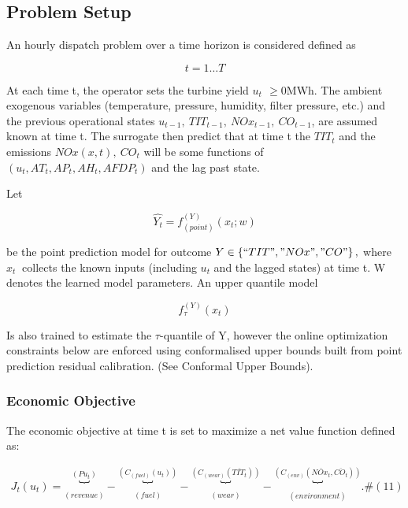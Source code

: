 \documentclass[11pt]{article}
\begin{document}
\section{}\label{section-7}

\subsection{\texorpdfstring{Problem Setup
}{Problem Setup }}\label{problem-setup}

An hourly dispatch problem over a time horizon is considered defined as

\[t = 1\ldots T\]

At each time t, the operator sets the turbine yield
\(u_{t\ }\  \geq 0\)MWh. The ambient exogenous variables (temperature,
pressure, humidity, filter pressure, etc.) and the previous operational
states \(u_{t - 1},\ TIT_{t - 1},\ NOx_{t - 1},\ CO_{t - 1}\), are
assumed known at time t. The surrogate then predict that at time t the
\(TIT_{t}\) and the emissions \(NOx(x,t),\ CO_{t}\) will be some
functions of \(\left( u_{t},AT_{t},AP_{t},AH_{t},AFDP_{t} \right)\) and
the lag past state.

Let

\[\widehat{Y_{t}} = f_{(point)}^{(Y)}\left( x_{t};w \right)\]

be the point prediction model for outcome
\(Y \in \left\{ ``TIT","NOx","CO" \right\},\ \)where \(x_{t}\ \)
collects the known inputs (including \(u_{t}\) and the lagged states) at
time t. W denotes the learned model parameters. An upper quantile model

\[f_{\tau}^{(Y)}\left( x_{t} \right)\]

Is also trained to estimate the \(\tau\)-quantile of Y, however the
online optimization constraints below are enforced using conformalised
upper bounds built from point prediction residual calibration. (See
Conformal Upper Bounds).

\subsubsection{Economic Objective}\label{economic-objective}

The economic objective at time t is set to maximize a net value function
defined as:

\[\begin{array}{r}
J_{t}\left( u_{t} \right) = \underset{(revenue)}{\overset{\left( Pu_{t} \right)}{︸}} - \underset{(fuel)}{\overset{\left( C_{(fuel)}\left( u_{t} \right) \right)}{︸}} - \underset{(wear)}{\overset{\left( C_{(wear)}\left( \overline{TIT_{t}} \right) \right)}{︸}} - \underset{(environment)}{\overset{\left( C_{(env)}\left( \overline{NOx_{t}},\overline{CO_{t}} \right) \right)}{︸}}.\#(11)
\end{array}\]
\end{document}

